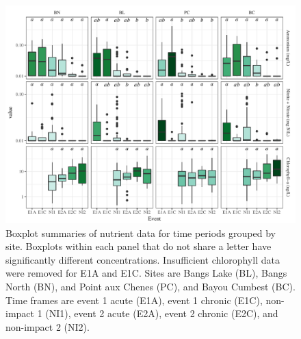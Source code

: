 \documentclass[letterpaper,12pt]{article}\usepackage[]{graphicx}\usepackage[]{color}
\makeatletter
\def\maxwidth{ %
  \ifdim\Gin@nat@width>\linewidth
    \linewidth
  \else
    \Gin@nat@width
  \fi
}
\makeatother
\begin{document}
\begin{figure}[!ht]

{\centering \includegraphics[width=\maxwidth]{figs/FigS1} 

}

\caption[Boxplot summaries of nutrient data for time periods grouped by site]{Boxplot summaries of nutrient data for time periods grouped by site. Boxplots within each panel that do not share a letter have significantly different concentrations. Insufficient chlorophyll data were removed for E1A and E1C. Sites are Bangs Lake (BL), Bangs North (BN), and Point aux Chenes (PC), and Bayou Cumbest (BC).  Time frames are event 1 acute (E1A), event 1 chronic (E1C), non-impact 1 (NI1), event 2 acute (E2A), event 2 chronic (E2C), and non-impact 2 (NI2).}\label{fig:FigS1}
\end{figure}


\clearpage
\end{document}
